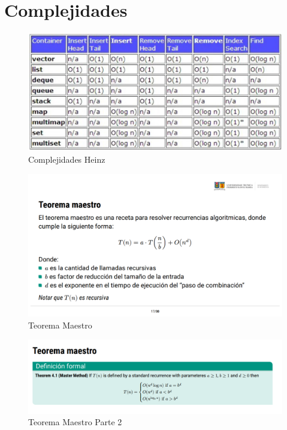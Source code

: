 \section{Complejidades}

\begin{figure}[h!]
\centering
\includegraphics[width=1\textwidth]{Imagen de WhatsApp 2024-11-22 a las 16.47.40_da962cd3.jpg}
\caption{Complejidades Heinz}
\label{fig:mi_imagen} %
\end{figure}


\begin{figure}[h!]
    \centering
    \includegraphics[width=1\linewidth]{imagen_2024-11-22_170622823.png}
    \caption{Teorema Maestro}
    \label{fig:enter-label}
\end{figure}



\begin{figure}[h!]
    \centering
    \includegraphics[width=0.7\linewidth]{imagen_2024-11-22_170723408.png}
    \caption{Teorema Maestro Parte 2}
    \label{fig:enter-label}
\end{figure}


